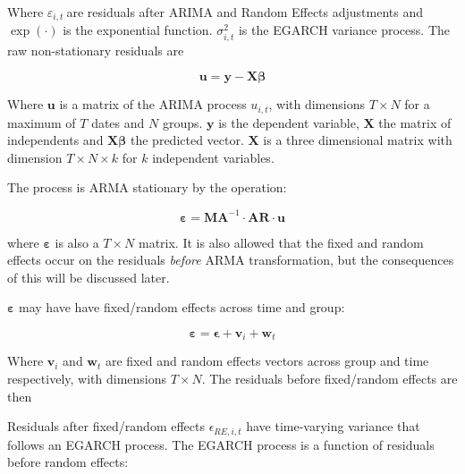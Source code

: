 \documentclass{article}
\begin{document}
Where $\varepsilon_{i,t}\ $are residuals after ARIMA and Random
Effects adjustments and $\exp( \cdot )$ is the exponential function.
$\sigma_{i,t}^{2}$ is the EGARCH variance process. The raw
non-stationary residuals are



  

\begin{equation}
\mathbf{u} = \mathbf{y} - \mathbf{X\beta}
\label{eq:70}
\end{equation}


Where $\mathbf{u}$ is a matrix of the ARIMA process $u_{i,t}$,
with dimensions $T \times N$ for a maximum of $T$ dates and $N$
groups. $\mathbf{y}$ is the dependent variable, $\mathbf{X}$ the
matrix of independents and $\mathbf{X\beta}$ the predicted vector.
$\mathbf{X}$ is a three dimensional matrix with dimension
$T \times N \times k$ for $k$ independent variables.

The process is ARMA stationary by the operation:



  

\begin{equation}
\mathbf{\varepsilon} = \mathbf{MA}^{- 1} \cdot \mathbf{AR \cdot u}
\label{eq:71}
\end{equation}


where $\mathbf{\varepsilon}$ is also a $T \times N$ matrix. It is
also allowed that the fixed and random effects occur on the residuals
\emph{before} ARMA transformation, but the consequences of this will be
discussed later.

$\mathbf{\varepsilon}$ may have have fixed/random effects across time
and group:



  

\begin{equation}\mathbf{\varepsilon} = \mathbf{\epsilon} + \mathbf{v}_{i} + \mathbf{w}_{t}
\label{eq:auto_4}
\end{equation}


Where $\mathbf{v}_{i}$ and $\mathbf{w}_{t}$ are fixed and random
effects vectors across group and time respectively, with dimensions
$T \times N$. The residuals before fixed/random effects are then

Residuals after fixed/random effects $\epsilon_{RE,i,t}$ have
time-varying variance that follows an EGARCH process. The EGARCH process
is a function of residuals before random effects:
\end{document}
